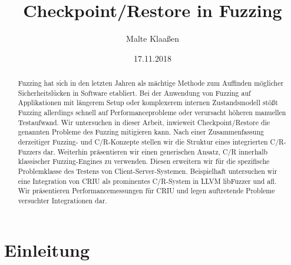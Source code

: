 \documentclass[a4paper]{article}
\begin{document}
\author{Malte Klaaßen}
\date{17.11.2018}
\title{Checkpoint/Restore in Fuzzing}

\maketitle

\begin{abstract}
    Fuzzing hat sich in den letzten Jahren als mächtige Methode zum Auffinden möglicher Sicherheitslücken in Software etabliert. 
    Bei der Anwendung von Fuzzing auf Applikationen mit längerem Setup oder komplexerem internen Zustandsmodell stößt Fuzzing allerdings schnell auf Performanceprobleme oder verursacht höheren manuellen Testaufwand. 
    Wir untersuchen in dieser Arbeit, inwieweit Checkpoint/Restore die genannten Probleme des Fuzzing mitigieren kann. 
    Nach einer Zusammenfassung derzeitiger Fuzzing- und C/R-Konzepte stellen wir die Struktur eines integrierten C/R-Fuzzers dar.
    Weiterhin präsentieren wir einen generischen Ansatz, C/R innerhalb klassischer Fuzzing-Engines zu verwenden. Diesen erweitern wir für die spezifische Problemklasse des Testens von Client-Server-Systemen. 
    Beispielhaft untersuchen wir eine Integration von CRIU als prominentes C/R-System in LLVM libFuzzer und afl.
    Wir präsentieren Performancemessungen für CRIU und legen auftretende Probleme versuchter Integrationen dar.
\end{abstract}

\tableofcontents

\section{Einleitung}
\end{document}
